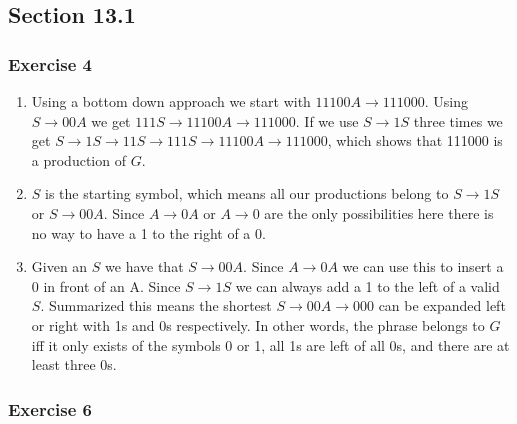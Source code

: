 \documentclass[a4paper]{article}
\newcommand{\ex}[1]{\subsubsection*{#1}}
\begin{document}
\pagestyle{fancy} %



\subsection*{Section 13.1}
\ex{Exercise 4}

\begin{enumerate}[label=\alph*)]
    \item Using a bottom down approach we start with \(11100A \to 111000\).
        Using \(S \to 00A\) we get \(111S \to 11100A \to 111000\). If we use
        \(S \to 1S\) three times we get \(S \to 1S \to 11S \to 111S \to 11100A
        \to 111000\), which shows that 111000 is a production of \(G\).
    \item \(S\) is the starting symbol, which means all our productions belong
        to \(S \to 1S\) or \(S \to 00A\). Since \(A \to 0A\) or \(A \to 0\) are
        the only possibilities here there is no way to have a 1 to the right of
        a 0.
    \item Given an \(S\) we have that \(S \to 00A\). Since \(A \to 0A\) we can
        use this to insert a 0 in front of an A. Since \(S \to 1S\) we can
        always add a 1 to the left of a valid \(S\). Summarized this means the
        shortest \(S \to 00A \to 000\) can be expanded left or right with 1s
        and 0s respectively. In other words, the phrase belongs to \(G\) iff it
        only exists of the symbols 0 or 1, all 1s are left of all 0s, and there
        are at least three 0s. 
\end{enumerate}


\ex{Exercise 6} 
\end{document}
